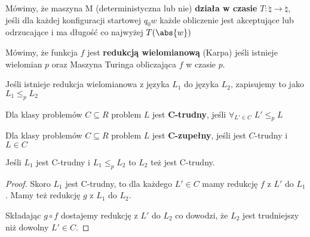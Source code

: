 \begin{definition}
    Mówimy, że maszyna M (deterministyczna lub nie) \textbf{działa w czasie} \( T : \natural \rightarrow \natural \), jeśli dla każdej konfiguracji startowej \( q_0 w \) każde obliczenie jest akceptujące lub odrzucające i ma długość co najwyżej \( T(\abs{w}) \)
\end{definition}

\begin{definition}
    Mówimy, że funkcja \( f \) jest \textbf{redukcją wielomianową} (Karpa) jeśli istnieje wielomian \( p \) oraz Maszyna Turinga obliczająca \( f \) w czasie \( p \). 
    
    Jeśli istnieje redukcja wielomianowa z języka \( L_1 \) do języka \( L_2 \), zapisujemy to jako \( L_1 \leq_p L_2 \)
\end{definition}

\begin{definition}
    Dla klasy problemów \( C \subseteq R \) problem \( L \) jest \textbf{C-trudny}, jeśli \( \forall_{L' \in C}\; L' \leq_p L \)
\end{definition}
\begin{definition}
    Dla klasy problemów \( C \subseteq R \) problem \( L \) jest \textbf{C-zupełny}, jeśli jest \(C\)-trudny i \( L \in C \)
\end{definition}

\begin{lemma}
    Jeśli \( L_1 \) jest C-trudny i \( L_1 \leq_p L_2 \) to \( L_2 \) też jest C-trudny. 
\end{lemma}
\begin{proof}
    Skoro \( L_1 \) jest C-trudny, to dla każdego \( L' \in C \) mamy redukcję \( f \) z \( L' \) do \( L_1 \).
    Mamy też redukcję \( g \) z \( L_1 \) do \( L_2 \).
    
    Składając \( g \circ f \) dostajemy redukcję z \( L' \)  do \( L_2 \) co dowodzi, że \( L_2 \) jest trudniejszy niż dowolny \( L' \in C \).
\end{proof}
